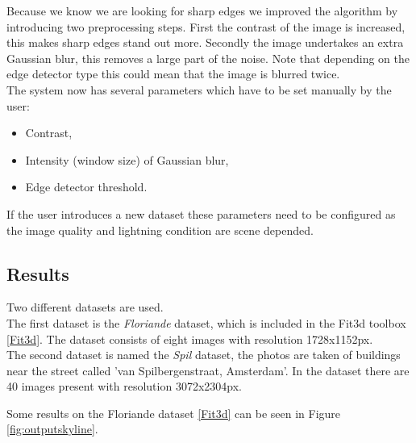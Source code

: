 Because we know we are looking for sharp edges we improved the algorithm by
introducing two preprocessing steps. First the contrast of the image is
increased, this makes sharp edges stand out more.  Secondly the image undertakes
an extra Gaussian blur, this removes a large part of the noise. Note that
depending on the edge detector type this could mean that the image is blurred
twice.\\


The system now has several parameters which have to be set manually by the user:
\begin{itemize}
	\item Contrast,
	\item Intensity (window size) of Gaussian blur,
	\item Edge detector threshold.
\end{itemize}

If the user introduces a new dataset these parameters need to be configured
as the image quality and lightning condition are scene depended.


\subsection{Results}%
Two different datasets are used. \\
The first dataset is the \emph{Floriande} dataset, which is included in the Fit3d toolbox \ref{Fit3d}. The dataset consists of eight images with resolution 1728x1152px.\\
The second dataset is named the \emph{Spil} dataset, the photos are taken of buildings near the street called 'van Spilbergenstraat, Amsterdam'.
In the dataset there are 40 images present with resolution 3072x2304px.


Some results on the Floriande dataset \ref{Fit3d}%
 can be seen in Figure \ref{fig:outputskyline}.


